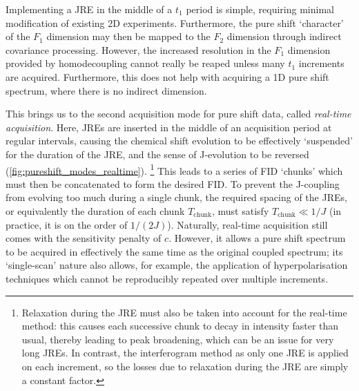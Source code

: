 Implementing a JRE in the middle of a $t_1$ period is simple, requiring minimal modification of existing 2D experiments.
Furthermore, the pure shift `character' of the $F_1$ dimension may then be mapped to the $F_2$ dimension through indirect covariance processing\autocite{Bruschweiler2004JCP,Zhang2004JACS,Jaeger2014ARNMRS,Morris2010JACS,Aguilar2012ACIE,Foroozandeh2014JACS}.
However, the increased resolution in the $F_1$ dimension provided by homodecoupling cannot really be reaped unless many $t_1$ increments are acquired.
Furthermore, this does not help with acquiring a 1D pure shift spectrum, where there is no indirect dimension.

This brings us to the second acquisition mode for pure shift data, called \textit{real-time acquisition}\autocite{Lupulescu2012JMR,Meyer2013ACIE,Mauhart2015JMR,Kiraly2018MRC}.
Here, JREs are inserted in the middle of an acquisition period at regular intervals, causing the chemical shift evolution to be effectively `suspended' for the duration of the JRE, and the sense of J-evolution to be reversed (\cref{fig:pureshift_modes_realtime}).%
\footnote{Relaxation during the JRE must also be taken into account for the real-time method: this causes each successive chunk to decay in intensity faster than usual, thereby leading to peak broadening, which can be an issue for very long JREs.
In contrast, the interferogram method as only one JRE is applied on each increment, so the losses due to relaxation during the JRE are simply a constant factor.}
This leads to a series of FID `chunks' which must then be concatenated to form the desired FID.
To prevent the J-coupling from evolving too much during a single chunk, the required spacing of the JREs, or equivalently the duration of each chunk $T_\text{chunk}$, must satisfy $T_\text{chunk} \ll 1/J$ (in practice, it is on the order of $1/(2J)$).
Naturally, real-time acquisition still comes with the sensitivity penalty of $c$.
However, it allows a pure shift spectrum to be acquired in effectively the same time as the original coupled spectrum; its `single-scan' nature also allows, for example, the application of hyperpolarisation techniques which cannot be reproducibly repeated over multiple increments.\autocite{Donovan2014ACIE,Taylor2021MRC}

